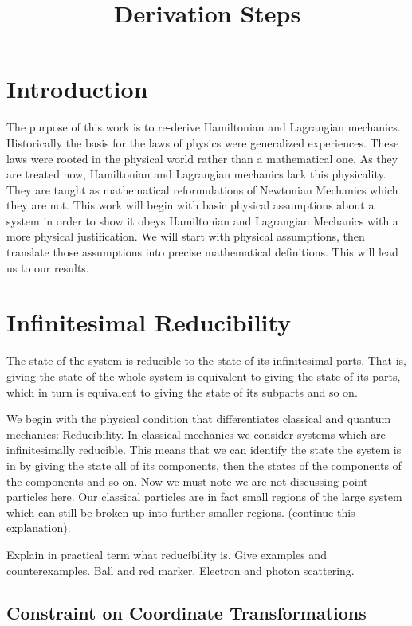 \documentclass{article}
\begin{document}
\title{Derivation Steps}

\section{Introduction}

	The purpose of this work is to re-derive Hamiltonian and Lagrangian mechanics. Historically the basis for the laws of physics were generalized experiences. These laws were rooted in the physical world rather than a mathematical one. As they are treated now, Hamiltonian and Lagrangian mechanics lack this physicality. They are taught as mathematical reformulations of Newtonian Mechanics which they are not. This work will begin with basic physical assumptions about a system in order to show it obeys Hamiltonian and Lagrangian Mechanics with a more physical justification. We will start with physical assumptions, then translate those assumptions into precise mathematical definitions. This will lead us to our results.

\section{Infinitesimal Reducibility}
	
\begin{assump}
	The state of the system is reducible to the state of its infinitesimal parts. That is, giving the state of the whole system is equivalent to giving the state of its parts, which in turn is equivalent to giving the state of its subparts and so on.
\end{assump}

	We begin with the physical condition that differentiates classical and quantum mechanics: Reducibility. In classical mechanics we consider systems which are infinitesimally reducible. This means that we can identify the state the system is in by giving the state all of its components, then the states of the components of the components and so on. Now we must note we are not discussing point particles here. Our classical particles are in fact small regions of the large system which can still be broken up into further smaller regions. (continue this explanation).
	
	Explain in practical term what reducibility is. Give examples and counterexamples. Ball and red marker. Electron and photon scattering.
	
\subsection{Constraint on Coordinate Transformations}
\end{document}
